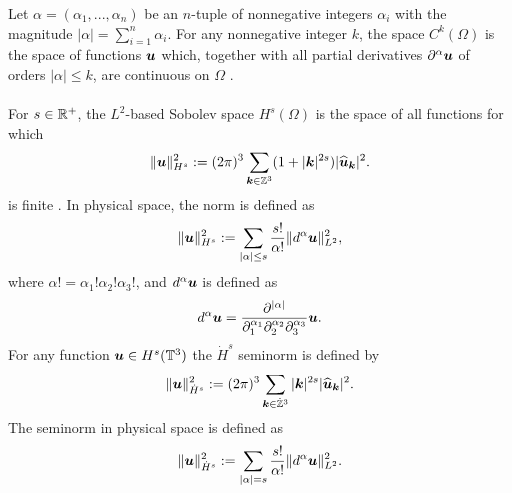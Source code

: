 {\color{red}
Let $\alpha = (\alpha_1,...,\alpha_n)$ be an $n$-tuple of nonnegative integers $\alpha_i$ with the magnitude $|\alpha| = \sum_{i=1}^n \alpha_i$. For any nonnegative integer $k$, the space $C^k(\Omega)$ is the space of functions $\boldsymbol u$ which, together with all partial derivatives $\partial^{\alpha}\boldsymbol u$ of orders $|\alpha|\leq k$, are continuous on $\Omega$ \cite{fournier_sobolev_2003}. 
\\~\\
For $s\in\mathbb{R}^+$, the $L^2$-based Sobolev space $H^s(\Omega)$ is the space of all functions for which
\begin{equation*}
\|\boldsymbol u\|_{H^s}^2 := (2\pi)^3\sum_{\boldsymbol k\in\mathbb{Z}^3}(1+|\boldsymbol k|^{2s})|\widehat{\boldsymbol u}_{\boldsymbol k}|^2.
\end{equation*}
is finite \cite{fournier_sobolev_2003,robinson_three-dimensional_2016}. In physical space, the norm is defined as
\begin{equation*}
\|\boldsymbol u\|_{H^s}^2 := \sum_{|\alpha | \leq s} \frac{s!}{\alpha!}\|d^{\alpha}\boldsymbol u\|_{L^2}^2,
\end{equation*} 
where $\alpha! = \alpha_1!\alpha_2!\alpha_3!$, and $d^\alpha \boldsymbol u$ is defined as
\begin{equation*}
d^\alpha \boldsymbol u = \frac{\partial^{|\alpha |}}{\partial_1^{\alpha_1}\partial_2^{\alpha_2}\partial_3^{\alpha_3}}\boldsymbol u.
\end{equation*}
For any function $\boldsymbol u\in H^s(\mathbb{T}^3)$ the $\dot{H}^s$ seminorm is defined by
\begin{equation*}
\|\boldsymbol u\|_{\dot{H}^s}^2 := (2\pi)^3\sum_{\boldsymbol k\in\dot{\mathbb{Z}}^3}|\boldsymbol k|^{2s}|\widehat{\boldsymbol u}_{\boldsymbol k}|^2.
\end{equation*}
The seminorm in physical space is defined as
\begin{equation*}
\|\boldsymbol u\|_{\dot{H}^s}^2 := \sum_{| \alpha | = s} \frac{s!}{\alpha!}\|d^{\alpha}\boldsymbol u\|_{L^2}^2.
\end{equation*}
}